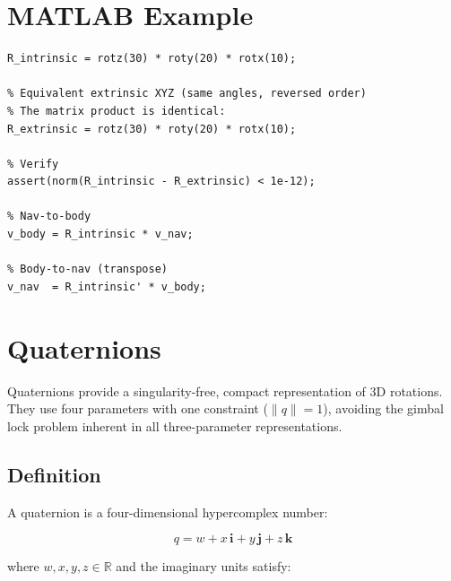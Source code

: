 \documentclass[12pt,a4paper]{article}
\begin{document}
\section{MATLAB Example}

\begin{lstlisting}[style=matlab, caption={Intrinsic ZYX and equivalent
extrinsic XYZ in MATLAB.}]
% Intrinsic ZYX (yaw=30 deg, pitch=20 deg, roll=10 deg)
R_intrinsic = rotz(30) * roty(20) * rotx(10);

% Equivalent extrinsic XYZ (same angles, reversed order)
% The matrix product is identical:
R_extrinsic = rotz(30) * roty(20) * rotx(10);

% Verify
assert(norm(R_intrinsic - R_extrinsic) < 1e-12);

% Nav-to-body
v_body = R_intrinsic * v_nav;

% Body-to-nav (transpose)
v_nav  = R_intrinsic' * v_body;
\end{lstlisting}

\section{Quaternions}

Quaternions provide a singularity-free, compact representation of 3D
rotations. They use four parameters with one constraint ($\|q\|=1$),
avoiding the gimbal lock problem inherent in all three-parameter
representations.

\subsection{Definition}

A quaternion is a four-dimensional hypercomplex number:

\begin{equation}
  q = w + x\,\mathbf{i} + y\,\mathbf{j} + z\,\mathbf{k}
\end{equation}

where $w,x,y,z \in \mathbb{R}$ and the imaginary units satisfy:
\end{document}
